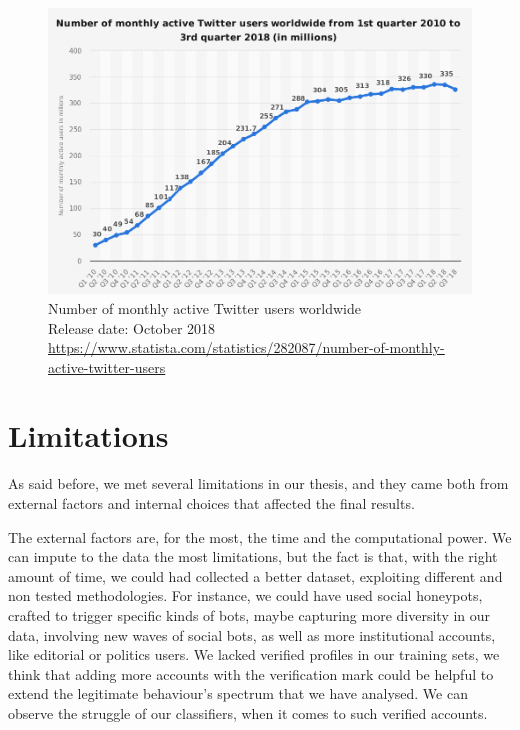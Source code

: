 \begin{figure}[t!]
	\begin{center}
		\includegraphics[width=\columnwidth]{chapter8/figure/active_accounts.png}
	\end{center}
	\caption{Number of monthly active Twitter users worldwide\\
	Release date: October 2018\\
	\url{https://www.statista.com/statistics/282087/number-of-monthly-active-twitter-users}}
	\label{fig:active}
\end{figure}

\section{Limitations}
As said before, we met several limitations in our thesis, and they came both from external factors and internal choices that affected the final results.

The external factors are, for the most, the time and the computational power.
We can impute to the data the most limitations, but the fact is that, with the right amount of time, we could had collected a better dataset, exploiting different and non tested methodologies. For instance, we could have used social honeypots, crafted to trigger specific kinds of bots, maybe capturing more diversity in our data, involving new waves of social bots, as well as more institutional accounts, like editorial or politics users. We lacked verified profiles in our training sets, we think that adding more accounts with the verification mark could be helpful to extend the legitimate behaviour's spectrum that we have analysed. We can observe the struggle of our classifiers, when it comes to such verified accounts.

